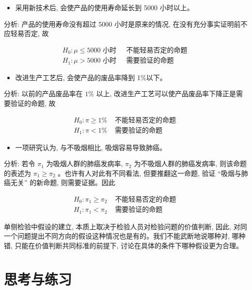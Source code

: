 \documentclass[10pt]{article}
\begin{document}
\begin{CJK*}{UTF8}{bsmi}
\begin{itemize}
  \item 采用新技术后, 会使产品的使用寿命延长到 5000 小时以上。
\end{itemize}

分析: 产品的使用寿命没有超过 5000 小时是原来的情况, 在没有充分事实证明前不应轻易否定, 故

$$
\begin{array}{ll}
H_{0}: \mu \leqslant 5000 \text { 小时 } & \text { 不能轻易否定的命题 } \\
H_{1}: \mu>5000 \text { 小时 } & \text { 需要验证的命题 }
\end{array}
$$

\begin{itemize}
  \item 改进生产工艺后, 会使产品的废品率降到 1\%以下。
\end{itemize}

分析: 以前的产品废品率在 $1 \%$ 以上, 改进生产工艺可以使产品废品率下降正是需要验证的命题, 故

$$
\begin{array}{ll}
H_{0}: \pi \geqslant 1 \% & \text { 不能轻易否定的命题 } \\
H_{1}: \pi<1 \% & \text { 需要验证的命题 }
\end{array}
$$

\begin{itemize}
  \item 一项研究认为, 与不吸烟相比, 吸烟容易导致肺癌。
\end{itemize}

分析: 若令 $\pi_{1}$ 为吸烟人群的肺癌发病率, $\pi_{2}$ 为不吸烟人群的肺癌发病率, 则该命题的表述为 $\pi_{1} \geqslant \pi_{2}$ 。也许有人对此有不同看法, 但要推翻这一命题, 验证 “吸烟与肺癌无关” 的新命题, 则需要证据。因此

$$
\begin{array}{ll}
H_{0}: \pi_{1} \geqslant \pi_{2} & \text { 不能轻易否定的命题 } \\
H_{1}: \pi_{1}<\pi_{2} & \text { 需要验证的命题 }
\end{array}
$$

单侧检验中假设的建立, 本质上取决于检验人员对检验问题的价值判断, 因此, 对同一个问题提出不同方向的假设这种情况也是有的。我们不能武断地说哪种对, 哪种错, 只能在价值判断共同标准的前提下, 讨论在具体的条件下哪种假设更为合理。

\section*{思考与练习}

\end{CJK*}
\end{document}
